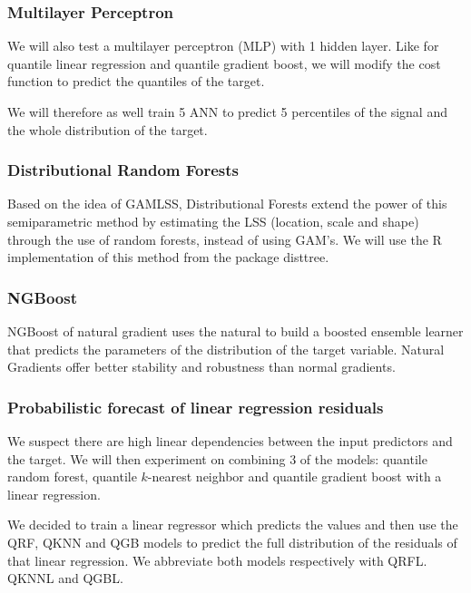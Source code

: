 \documentclass[a4paper,3p,sort&compress]{elsarticle}
\begin{document}
\subsubsection{Multilayer Perceptron}

We will also test a multilayer perceptron (MLP) 
\cite{ramchoun_multilayer_2016} with 1 hidden layer. 
Like for quantile linear regression and quantile gradient boost, 
we will modify the cost function to predict the quantiles of the target.

We will therefore as well train 5 ANN to predict 5 percentiles of the \no signal
and the whole distribution of the target.

\subsubsection{Distributional Random Forests}

Based on the idea of GAMLSS, Distributional Forests 
\cite{schlosser_distributional_2019} extend the power 
of this semiparametric method by estimating the LSS 
(location, scale and shape) through the use of random forests, 
instead of using GAM's. We will use the R implementation of this 
method from the package disttree.

\subsubsection{NGBoost}

NGBoost of natural gradient \cite{duan_ngboost_2019} uses the natural to 
build a boosted ensemble 
learner that predicts the parameters of the distribution of the target variable.
Natural Gradients offer better stability and robustness than normal gradients.


\subsubsection{Probabilistic forecast of linear regression residuals}

We suspect there are high linear dependencies between the
input predictors and the target. We will then experiment 
on combining 3 of the models: quantile random forest, quantile
$k$-nearest neighbor and quantile gradient boost with a linear regression.

We decided to train a linear regressor which predicts the
\no values and then use the QRF, QKNN and QGB models 
to predict the full distribution of the residuals
of that linear regression. We abbreviate both models respectively with
QRFL. QKNNL and QGBL.
\end{document}
